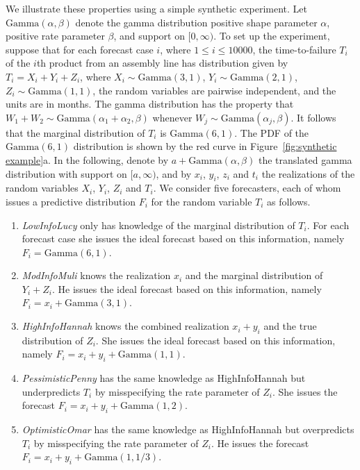 \documentclass[10pt]{article} %
\theoremstyle{theorem}
\theoremstyle{definition}
\begin{document}
We illustrate these properties using a simple synthetic experiment. Let $\mathrm{Gamma}(\alpha, \beta)$ denote the gamma distribution positive shape parameter $\alpha$, positive rate parameter $\beta$, and support on $[0,\infty)$. To set up the experiment, suppose that for each forecast case $i$, where $1\leq i\leq 10000$, the time-to-failure $T_i$ of the $i$th product from an assembly line has distribution given by $T_i=X_i+Y_i+Z_i$, where $X_i\sim \mathrm{Gamma}(3, 1)$, $Y_i\sim \mathrm{Gamma}(2, 1)$, $Z_i \sim \mathrm{Gamma}(1, 1)$, the random variables are pairwise independent, and the units are in months. The gamma distribution has the property that $W_1+W_2\sim\mathrm{Gamma}(\alpha_1+\alpha_2, \beta)$ whenever $W_j\sim\mathrm{Gamma}(\alpha_j, \beta)$. It follows that the marginal distribution of $T_i$ is $\mathrm{Gamma}(6,1)$. The PDF of the $\mathrm{Gamma}(6,1)$ distribution is shown by the red curve in Figure~\ref{fig:synthetic example}a. In the following, denote by $a + \mathrm{Gamma}(\alpha,\beta)$ the translated gamma distribution with support on $[a,\infty)$, and by $x_i$, $y_i$, $z_i$ and $t_i$ the realizations of the random variables $X_i$, $Y_i$, $Z_i$ and $T_i$. We consider five forecasters, each of whom issues a predictive distribution $F_i$ for the random variable $T_i$ as follows.
\begin{enumerate}
\item \textit{LowInfoLucy} only has knowledge of the marginal distribution of $T_i$. For each forecast case she issues the ideal forecast based on this information, namely $F_i=\mathrm{Gamma}(6, 1)$.
\item \textit{ModInfoMuli} knows the realization $x_i$ and the marginal distribution of $Y_i+Z_i$. He issues the ideal forecast based on this information, namely $F_i=x_i+\mathrm{Gamma}(3,1)$.
\item \textit{HighInfoHannah} knows the combined realization $x_i+y_i$ and the true distribution of $Z_i$. She issues the ideal forecast based on this information, namely $F_i=x_i+y_i+\mathrm{Gamma}(1,1)$.
\item \textit{PessimisticPenny} has the same knowledge as HighInfoHannah but underpredicts $T_i$ by misspecifying the rate parameter of $Z_i$. She issues the forecast $F_i=x_i+y_i+\mathrm{Gamma}(1,2)$.
\item \textit{OptimisticOmar} has the same knowledge as HighInfoHannah but overpredicts $T_i$ by misspecifying the rate parameter of $Z_i$. He issues the forecast $F_i=x_i+y_i+\mathrm{Gamma}(1,1/3)$.
\end{enumerate}
\end{document}
